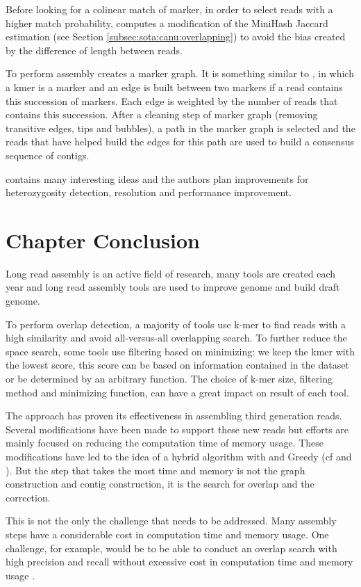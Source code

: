 \documentclass[main]{subfiles}
\begin{document}
Before looking for a colinear match of marker, in order to select reads with a higher match probability, \shasta computes a modification of the MiniHash Jaccard estimation (see Section \ref{subsec:sota:canu:overlapping}) to avoid the bias created by the difference of length between reads.

To perform assembly \shasta creates a marker graph. It is something similar to \DBG, in which a kmer is a marker and an edge is built between two markers if a read contains this succession of markers. Each edge is weighted by the number of reads that contains this succession. After a cleaning step of marker graph (removing transitive edges, tips and bubbles), a path in the marker graph is selected and the reads that have helped build the edges for this path are used to build a consensus sequence of contigs.

\shasta contains many interesting ideas and the authors plan improvements for heterozygosity detection, resolution and performance improvement.

\section{Chapter Conclusion}

Long read assembly is an active field of research, many tools are created each year and long read assembly tools are used to improve genome and build draft genome.

To perform overlap detection, a majority of tools use k-mer to find reads with a high similarity and avoid all-versus-all overlapping search. To further reduce the space search, some tools use filtering based on minimizing: we keep the kmer with the lowest score, this score can be based on information contained in the dataset or be determined by an arbitrary function. The choice of k-mer size, filtering method and minimizing function, can have a great impact on result of each tool.

The \OLC approach has proven its effectiveness in assembling third generation reads. Several modifications have been made to support these new reads but efforts are mainly focused on reducing the computation time of memory usage. These modifications have led to the idea of a hybrid \OLC algorithm with \DBG and Greedy (cf \flye and \wtdbg). But the step that takes the most time and memory is not the graph construction and contig construction, it is the search for overlap and the correction.

This is not the only the challenge that needs to be addressed. Many assembly steps have a considerable cost in computation time and memory usage. One challenge, for example, would be to be able to conduct an overlap search with high precision and recall without excessive cost in computation time and memory usage \cite{bench_ovl}.
\end{document}
